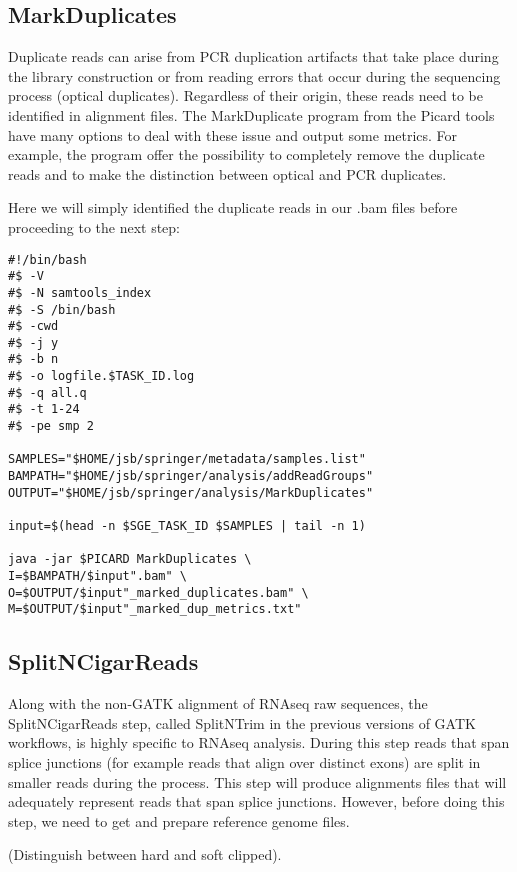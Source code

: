 \subsection{MarkDuplicates}


Duplicate reads can arise from PCR duplication artifacts that take place during the library construction or from reading errors that occur during the sequencing process (optical duplicates). Regardless of their origin, these reads need to be identified in alignment files. The MarkDuplicate program from the Picard tools have many options to deal with these issue and output some metrics. For example, the program offer the possibility to completely remove the duplicate reads and to make the distinction between optical and PCR duplicates.

Here we will simply identified the duplicate reads in our .bam files before proceeding to the next step:

\begin{verbatim}
#!/bin/bash
#$ -V
#$ -N samtools_index
#$ -S /bin/bash
#$ -cwd
#$ -j y
#$ -b n
#$ -o logfile.$TASK_ID.log
#$ -q all.q
#$ -t 1-24
#$ -pe smp 2

SAMPLES="$HOME/jsb/springer/metadata/samples.list"
BAMPATH="$HOME/jsb/springer/analysis/addReadGroups"
OUTPUT="$HOME/jsb/springer/analysis/MarkDuplicates"

input=$(head -n $SGE_TASK_ID $SAMPLES | tail -n 1)

java -jar $PICARD MarkDuplicates \
I=$BAMPATH/$input".bam" \
O=$OUTPUT/$input"_marked_duplicates.bam" \
M=$OUTPUT/$input"_marked_dup_metrics.txt"
\end{verbatim}

\subsection{SplitNCigarReads}

Along with the non-GATK alignment of RNAseq raw sequences, the SplitNCigarReads step, called SplitNTrim in the previous versions of GATK workflows, is highly specific to RNAseq analysis. During this step reads that span splice junctions (for example reads that align over distinct exons) are split in smaller reads during the process. This step will produce alignments files that will adequately represent reads that span splice junctions. However, before doing this step, we need to get and prepare reference genome files.

(Distinguish between hard and soft clipped).


